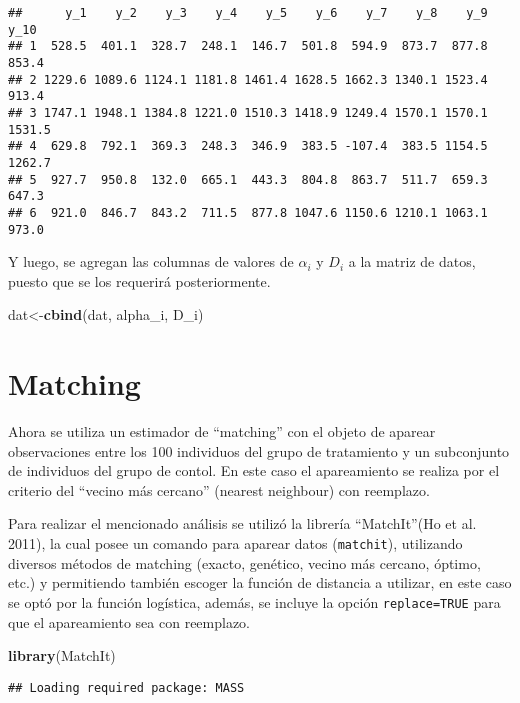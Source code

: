 \documentclass[]{article}
\newenvironment{Shaded}{\begin{snugshade}}{\end{snugshade}}
\newcommand{\KeywordTok}[1]{\textcolor[rgb]{0.13,0.29,0.53}{\textbf{{#1}}}}
\newcommand{\NormalTok}[1]{{#1}}
\begin{document}
\begin{verbatim}
##      y_1    y_2    y_3    y_4    y_5    y_6    y_7    y_8    y_9   y_10
## 1  528.5  401.1  328.7  248.1  146.7  501.8  594.9  873.7  877.8  853.4
## 2 1229.6 1089.6 1124.1 1181.8 1461.4 1628.5 1662.3 1340.1 1523.4  913.4
## 3 1747.1 1948.1 1384.8 1221.0 1510.3 1418.9 1249.4 1570.1 1570.1 1531.5
## 4  629.8  792.1  369.3  248.3  346.9  383.5 -107.4  383.5 1154.5 1262.7
## 5  927.7  950.8  132.0  665.1  443.3  804.8  863.7  511.7  659.3  647.3
## 6  921.0  846.7  843.2  711.5  877.8 1047.6 1150.6 1210.1 1063.1  973.0
\end{verbatim}

Y luego, se agregan las columnas de valores de $\alpha_{i}$ y $D_{i}$ a
la matriz de datos, puesto que se los requerirá posteriormente.

\begin{Shaded}
\begin{Highlighting}[]
\NormalTok{dat<-}\KeywordTok{cbind}\NormalTok{(dat, alpha_i, D_i)}
\end{Highlighting}
\end{Shaded}

\section{Matching}\label{matching}

Ahora se utiliza un estimador de ``matching'' con el objeto de aparear
observaciones entre los 100 individuos del grupo de tratamiento y un
subconjunto de individuos del grupo de contol. En este caso el
apareamiento se realiza por el criterio del ``vecino más cercano''
(nearest neighbour) con reemplazo.

Para realizar el mencionado análisis se utilizó la librería
``MatchIt''(Ho et al. 2011), la cual posee un comando para aparear datos
(\texttt{matchit}), utilizando diversos métodos de matching (exacto,
genético, vecino más cercano, óptimo, etc.) y permitiendo también
escoger la función de distancia a utilizar, en este caso se optó por la
función logística, además, se incluye la opción \texttt{replace=TRUE}
para que el apareamiento sea con reemplazo.

\begin{Shaded}
\begin{Highlighting}[]
\KeywordTok{library}\NormalTok{(MatchIt)}
\end{Highlighting}
\end{Shaded}

\begin{verbatim}
## Loading required package: MASS
\end{verbatim}
\end{document}
